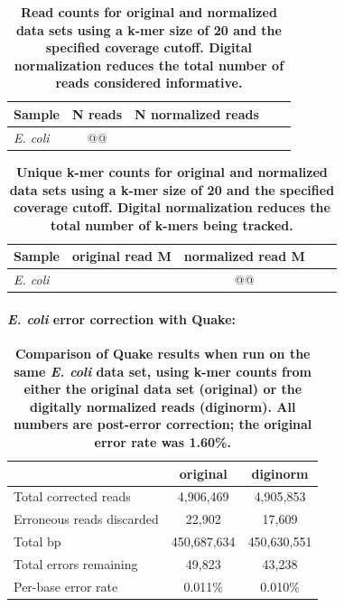 \documentclass{article}
\begin{document}
\begin{table}
\begin{tabular}{|l|c|c|c|c|}
\hline
Sample              & N reads & N normalized reads \\
\hline
{\em E. coli}       &    @@        & \\
\hline
\end{tabular}

\caption{{\bf Read counts for original and normalized data sets using
    a k-mer size of 20 and the specified coverage cutoff. Digital
    normalization reduces the total number of reads considered
    informative.}}
\label{tab:read_counts}
\end{table}

\begin{table}
\begin{tabular}{|l|c|c|c|c|}
\hline
Sample              & original read M & normalized read M \\
\hline
{\em E. coli}       &            & @@ \\
\hline
\end{tabular}

\caption{{\bf Unique k-mer counts for original and normalized data sets using a
  k-mer size of 20 and the specified coverage cutoff.  Digital
  normalization reduces the total number of k-mers being tracked.}}

\label{tab:kmer_counts}
\end{table}


\paragraph{{\em E. coli} error correction with Quake:}


\begin{table}
\begin{tabular}{|l|c|c|}
\hline
                                 & original    & diginorm \\
\hline
Total corrected reads            & 4,906,469   & 4,905,853 \\
Erroneous reads discarded        & 22,902      & 17,609 \\
Total bp                         & 450,687,634 & 450,630,551 \\
Total errors remaining           & 49,823      & 43,238 \\
Per-base error rate              & 0.011\%     & 0.010\% \\
\hline
\end{tabular}

\caption{{\bf Comparison of Quake results when run on the same {\em
      E. coli} data set, using k-mer counts from either the original
    data set (original) or the digitally normalized reads
    (diginorm).  All numbers are post-error correction; the original
    error rate was 1.60\%.}}

\label{tab:quake_ecoli}
\end{table}
\end{document}
